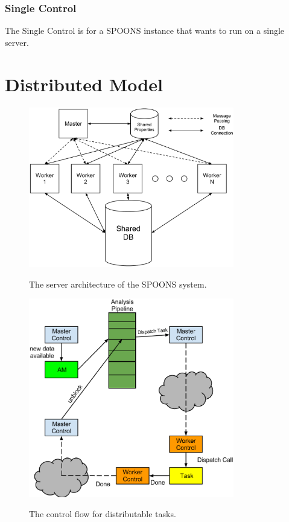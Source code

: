 \documentclass[12pt]{ucthesis}
\newcommand{\captionfonts}{\small\bf\ssp}
\begin{document}
\subsection{Single Control}
\label{arch-single-control}
The Single Control is for a SPOONS instance that wants to run on a single server.

\chapter{Distributed Model}
\label{arch-dist}

\begin{figure}
   \begin{center}
      \includegraphics[width=0.8\textwidth]{images/SPOONS_Server_Architecture.eps}
      \captionfonts
      \caption[SPOONS Server Architecture]{The server architecture of the SPOONS system.}
      \label{fig:serverArch}
   \end{center}
\end{figure}

\begin{figure}
   \begin{center}
      \includegraphics[width=0.8\textwidth]{images/SPOONS_Distributable_Task_Control_Flow.eps}
      \captionfonts
      \caption[SPOONS Distributable Task Flow]{The control flow for distributable tasks.}
      \label{fig:taskFlow}
   \end{center}
\end{figure}
\end{document}
